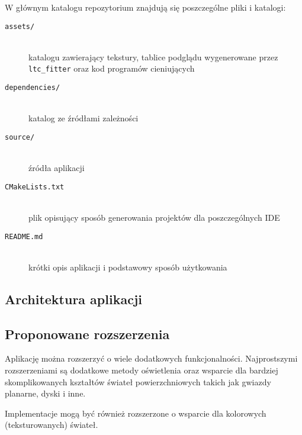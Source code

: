 \documentclass[../main.tex]{subfiles}
\begin{document}
W głównym katalogu repozytorium znajdują się poszczególne pliki i katalogi:

\begin{description}
    \item[\texttt{assets/}] \hfill \\ 
    katalogu zawierający tekstury, tablice podglądu wygenerowane przez \texttt{ltc\_fitter} oraz kod programów cieniujących
    
    \item[\texttt{dependencies/}] \hfill \\ 
    katalog ze źródłami zależności
    
    \item[\texttt{source/}] \hfill \\ źródła aplikacji
    
    \item[\texttt{CMakeLists.txt}] \hfill\\ 
    plik opisujący sposób generowania projektów dla poszczególnych IDE 

    \item[\texttt{README.md}] \hfill\\ 
    krótki opis aplikacji i podstawowy sposób użytkowania 
    
\end{description}

\subsection{Architektura aplikacji}
\subsection{Proponowane rozszerzenia}

Aplikację można rozszerzyć o wiele dodatkowych funkcjonalności. Najprostszymi rozszerzeniami są dodatkowe metody oświetlenia oraz wsparcie dla bardziej skomplikowanych kształtów świateł powierzchniowych takich jak gwiazdy planarne, dyski i inne.

Implementacje mogą być również rozszerzone o wsparcie dla kolorowych (teksturowanych) świateł.
\end{document}
